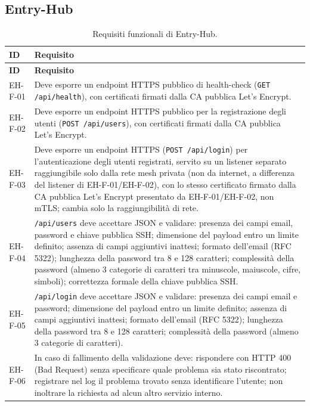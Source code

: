 \subsection{Entry-Hub}

\begin{longtable}{p{2.6cm} p{\dimexpr\linewidth-2.6cm-4\tabcolsep\relax}}
\caption{Requisiti funzionali di Entry-Hub.} \\
\hline
\textbf{ID} & \textbf{Requisito} \\
\hline
\endfirsthead
\hline
\textbf{ID} & \textbf{Requisito} \\
\hline
\endhead
\hline
\endfoot
\hline
\endlastfoot
EH-F-01 & Deve esporre un endpoint HTTPS pubblico di health-check (\texttt{GET /api/health}), con certificati firmati dalla CA pubblica Let's Encrypt. \\
EH-F-02 & Deve esporre un endpoint HTTPS pubblico per la registrazione degli utenti (\texttt{POST /api/users}), con certificati firmati dalla CA pubblica Let's Encrypt. \\
EH-F-03 & Deve esporre un endpoint HTTPS (\texttt{POST /api/login}) per l'autenticazione degli utenti registrati, servito su un listener separato raggiungibile solo dalla rete mesh privata (non da internet, a differenza del listener di EH-F-01/EH-F-02), con lo stesso certificato firmato dalla CA pubblica Let's Encrypt presentato da EH-F-01/EH-F-02, non mTLS; cambia solo la raggiungibilità di rete. \\
EH-F-04 & \texttt{/api/users} deve accettare JSON e validare: presenza dei campi email, password e chiave pubblica SSH; dimensione del payload entro un limite definito; assenza di campi aggiuntivi inattesi; formato dell'email (RFC 5322); lunghezza della password tra 8 e 128 caratteri; complessità della password (almeno 3 categorie di caratteri tra minuscole, maiuscole, cifre, simboli); correttezza formale della chiave pubblica SSH. \\
EH-F-05 & \texttt{/api/login} deve accettare JSON e validare: presenza dei campi email e password; dimensione del payload entro un limite definito; assenza di campi aggiuntivi inattesi; formato dell'email (RFC 5322); lunghezza della password tra 8 e 128 caratteri; complessità della password (almeno 3 categorie di caratteri). \\
EH-F-06 & In caso di fallimento della validazione deve: rispondere con HTTP 400 (Bad Request) senza specificare quale problema sia stato riscontrato; registrare nel log il problema trovato senza identificare l'utente; non inoltrare la richiesta ad alcun altro servizio interno. \\

\end{longtable}
